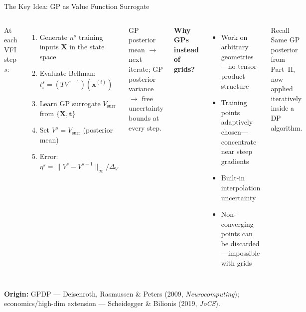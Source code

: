 \documentclass[aspectratio=169,11pt]{beamer}
\newcommand{\emphc}[1]{\textcolor{harvardcrimson}{#1}}
\newcommand{\x}{\bm{x}}
\newcommand{\X}{\bm{X}}
\begin{document}
\begin{frame}{The Key Idea: GP as Value Function Surrogate}
\scriptsize
\begin{columns}[T]
At each VFI step $s$:

\vspace{0.2em}
\begin{enumerate}\itemsep1pt
    \item Generate $n^s$ training inputs $\X$ in the state space
    \item Evaluate Bellman: $t_i^s = (TV^{s-1})(\x^{(i)})$
    \item Learn GP surrogate $V_{\text{surr}}$ from $\{\X, \bm{t}\}$
    \item Set $V^s = V_{\text{surr}}$ (posterior mean)
    \item Error: $\eta^s = \|V^s - V^{s-1}\|_\infty/\Delta_V$
\end{enumerate}

\vspace{0.2em}
GP posterior mean $\to$ next iterate; GP posterior \emphc{variance} $\to$ free uncertainty bounds at every step.

\textbf{Why GPs instead of grids?}

\vspace{0.2em}
\begin{itemize}\itemsep1pt
    \item Work on \emphc{arbitrary geometries}---no tensor-product structure
    \item Training points \emphc{adaptively chosen}---concentrate near steep gradients
    \item Built-in \emphc{interpolation uncertainty}
    \item Non-converging points can be \emphc{discarded}---impossible with grids
\end{itemize}

\vspace{0.2em}
\begin{block}{Recall}
\tiny
Same GP posterior from Part~II, now applied iteratively inside a DP algorithm.
\end{block}
\end{columns}

\vspace{0.1em}
{\tiny \textbf{Origin:} GPDP — Deisenroth, Rasmussen \& Peters (2009, \emph{Neurocomputing}); economics/high-dim extension — Scheidegger \& Bilionis (2019, \emph{JoCS}).}
\end{frame}
\end{document}

